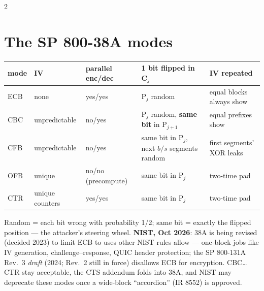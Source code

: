 \documentclass[8pt]{extarticle}
\begin{document}
\begin{multicols}{2}
\section{The SP 800-38A modes}
{\scriptsize\setlength{\tabcolsep}{2pt}
\begin{tabular}{@{}>{\raggedright\arraybackslash}p{7mm}>{\raggedright\arraybackslash}p{13mm}>{\raggedright\arraybackslash}p{9mm}>{\raggedright\arraybackslash}p{23mm}>{\raggedright\arraybackslash}p{20mm}@{}}
\toprule
\textbf{mode} & \textbf{IV} & \textbf{parallel enc/dec} & \textbf{1 bit flipped in C$_j$} & \textbf{IV repeated}\\ \midrule
ECB & none & yes/yes & P$_j$ random & equal blocks always show\\
CBC & unpredictable & no/yes & P$_j$ random, \textbf{same bit} in P$_{j+1}$ & equal prefixes show\\
CFB & unpredictable & no/yes & same bit in P$_j$, next $b/s$ segments random & first segments' XOR leaks\\
OFB & unique & no/no (precompute) & same bit in P$_j$ & two-time pad\\
CTR & unique counters & yes/yes & same bit in P$_j$ & two-time pad\\
\bottomrule
\end{tabular}}\par
Random = each bit wrong with probability 1/2; same bit = exactly the flipped position — the
attacker's steering wheel. \textbf{NIST, Oct 2026}: 38A is being revised (decided 2023) to limit ECB to
uses other NIST rules allow — one-block jobs like IV generation, challenge–response, QUIC header
protection; the SP 800-131A Rev.~3 \emph{draft} (2024; Rev.~2 still in force) disallows ECB for
encryption. CBC…CTR stay acceptable, the CTS addendum folds into 38A, and NIST may deprecate these
modes once a wide-block ``accordion'' (IR 8552) is approved.


\end{multicols}
\end{document}
